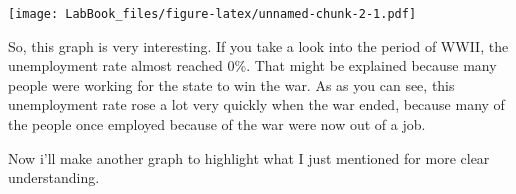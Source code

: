 \documentclass[]{article}
\newenvironment{Shaded}{\begin{snugshade}}{\end{snugshade}}
\newcommand{\KeywordTok}[1]{\textcolor[rgb]{0.13,0.29,0.53}{\textbf{#1}}}
\newcommand{\DataTypeTok}[1]{\textcolor[rgb]{0.13,0.29,0.53}{#1}}
\newcommand{\DecValTok}[1]{\textcolor[rgb]{0.00,0.00,0.81}{#1}}
\newcommand{\StringTok}[1]{\textcolor[rgb]{0.31,0.60,0.02}{#1}}
\newcommand{\OperatorTok}[1]{\textcolor[rgb]{0.81,0.36,0.00}{\textbf{#1}}}
\newcommand{\NormalTok}[1]{#1}
\begin{document}
\begin{Shaded}
\end{Shaded}

\texttt{[image: LabBook\_files/figure-latex/unnamed-chunk-2-1.pdf]}

So, this graph is very interesting. If you take a look into the period
of WWII, the unemployment rate almost reached 0\%. That might be
explained because many people were working for the state to win the war.
As as you can see, this unemployment rate rose a lot very quickly when
the war ended, because many of the people once employed because of the
war were now out of a job.

Now i'll make another graph to highlight what I just mentioned for more
clear understanding.
\end{document}
